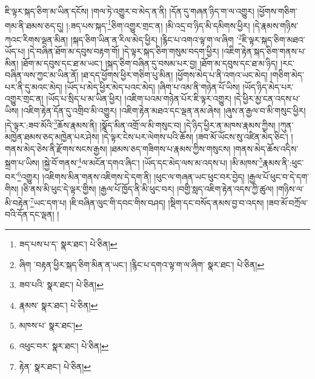 ཇི་ལྟར་སྐད་ཅིག་མ་ཡིན་དངོས། །གལ་ཏེ་འགྱུར་བ་མེད་ན་ནི། །དོན་དུ་གཞན་ཉིད་ག་ལ་འགྱུར། །ཕྱོགས་གཅིག་གམ་ནི་ཐམས་ཅད་དུ། །:ཟད་པས་སྐད་\footnote{ཟད་པས་པ་ད་  སྣར་ཐང་།  པེ་ཅིན། }ཅིག་འགྱུར་གྲང་ན། །མི་འདྲ་བ་ཉིད་མི་དམིགས་ཕྱིར། །དེ་རྣམས་གཉིས་ཀའང་རིགས་ལྡན་མིན། །སྐད་ཅིག་ཡིན་ན་རིལ་མེད་ཕྱིར། །རྙིང་པ་འགའ་ལྟ་ག་ལ་ཞིག ་\footnote{ཞིག ་བརྟན་ཕྱིར་སྐད་ཅིག་མིན་ན་ཡང་། །རྙིང་པ་དགའ་ལྟ་ག་ལ་ཞིག་  སྣར་ཐང་།  པེ་ཅིན། }ཇི་ལྟར་སྐད་ཅིག་མཐའ་ཡོད་པ། །དེ་བཞིན་ཐོག་མ་དབུས་བརྟག་གོ། །དེ་ལྟར་སྐད་ཅིག་གསུམ་བདག་ཕྱིར། །འཇིག་རྟེན་སྐད་ཅིག་གནས་པ་མིན། །ཐོག་མ་དབུས་དང་ཐ་མ་ཡང་། །སྐད་ཅིག་བཞིན་དུ་བསམ་པར་བྱ། །ཐོག་མ་དབུས་དང་ཐ་མ་ཉིད། །རང་བཞིན་ལས་ཀྱང་མ་ཡིན་ནོ། །ཐ་དད་ཕྱོགས་ཕྱིར་གཅིག་པུ་མིན། །ཕྱོགས་མེད་པ་ནི་འགའ་ཡང་མེད། །གཅིག་མེད་པར་ནི་དུ་མའང་མེད། །ཡོད་པ་མེད་ཕྱིར་མེད་པའང་མེད། །ཞིག་པ་འམ་ནི་གཉེན་པོ་ཡིས། །ཡོད་ཉིད་མེད་པར་འགྱུར་གྲང་ན། །ཡོད་པ་སྲིད་པ་མ་ཡིན་ཕྱིར། །འཇིག་པའམ་གཉེན་པོར་ཇི་ལྟར་འགྱུར། །དེ་ཕྱིར་མྱ་ངན་འདས་པ་ཡིས། །འཇིག་རྟེན་དོན་དུ་འགྲིབ་མི་འགྱུར། །འཇིག་རྟེན་མཐའ་དང་ལྡན་ནམ་ཞེས། །ཞུས་ན་རྒྱལ་བ་མི་གསུང་ཕྱིར། །དེ་ལྟར་:ཟབ་མོའི་\footnote{ཟབ་པའི་  སྣར་ཐང་།  པེ་ཅིན། }ཆོས་རྣམས་ནི། །སྣོད་མིན་འགྲོ་ལ་མི་གསུང་བ། །དེ་ཉིད་ཕྱིར་ན་མཁས་རྣམས་ཀྱིས། །ཀུན་མཁྱེན་ཐམས་ཅད་མཁྱེན་པར་ཤེས། །དེ་ལྟར་ངེས་པར་ལེགས་པའི་ཆོས། །ཟབ་མོ་ཡོངས་སུ་འཛིན་མེད་ཅིང་། །གནས་མེད་ཅེས་ནི་རྫོགས་སངས་རྒྱས། །ཐམས་ཅད་གཟིགས་པ་རྣམས་ཀྱིས་གསུངས། །གནས་མེད་ཆོས་འདིས་སྐྲག་པ་ཡིས། །སྐྱེ་བོ་གནས་\footnote{རྣམས་  སྣར་ཐང་།  པེ་ཅིན། }ལ་མངོན་དགའ་ཞིང་། །ཡོད་དང་མེད་ལས་མ་འདས་པ། །མི་མཁས་\footnote{མཁས་པ་  སྣར་ཐང་། }རྣམས་ནི་:ཕུང་བར་\footnote{འཕུང་བར་  སྣར་ཐང་།  པེ་ཅིན། }འགྱུར། །འཇིགས་མིན་གནས་འཇིགས་དེ་དག་ནི། །ཕུང་ལ་གཞན་ཡང་ཕུང་བར་བྱེད། །རྒྱལ་པོ་ཕུང་བ་དེ་དག་གིས། །ཅི་ནས་མི་ཕུང་དེ་ལྟར་གྱིས། །རྒྱལ་པོ་ཁྱོད་ནི་མི་ཕུང་བར། །བགྱི་སླད་འཇིག་རྟེན་འདས་ཀྱི་ཚུལ། །གཉིས་ལ་མི་བརྟེན་\footnote{རྟེན་  སྣར་ཐང་།  པེ་ཅིན། }ཡང་དག་པ། །ཇི་བཞིན་ལུང་གི་དབང་གིས་བཤད། །སྡིག་དང་བསོད་ནམས་བྱ་བ་འདས། །ཟབ་མོ་བཀྲོལ་བའི་དོན་དང་ལྡན། །
